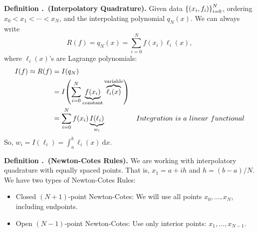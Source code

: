 \documentclass[12pt, a4paper]{article}
\newcounter{index}[subsection]
\newenvironment*{df}[1]{\par\noindent\textbf{Definition \thesubsection.\stepcounter{index}\theindex\ (#1).}}{\par}
\def\d{{\mathrm{d}}}
\def\dsst{\displaystyle}
\def\l{\ell}
\begin{document}
\begin{df}{Interpolatory Quadrature}
	Given data $\qty{(x_i,f_i)}_{i=0}^N$, ordering $x_0<x_1<\cdots<x_N$, and the interpolating polynomial $q_N(x)$. We can always write \[R(f)=q_N(x)=\sum_{i=0}^Nf(x_i)\l_i(x),\] where $\l_i(x)$'s are Lagrange polynomials: \begin{align*}I(f)\approx R(f)&=I(q_N)\\&=I\qty(\sum_{i=0}^N\underbrace{f(x_i)}_\text{constant}\overbrace{\l_i(x)}^\text{variable})\\&=\sum_{i=0}^Nf(x_i)\underbrace{I(\l_i)}_{w_i}&Integration\ is\ a\ linear\ functional\end{align*} So, $w_i=I(\l_i)=\dsst\int_a^b\l_i(x)\ \d{x}$.
\end{df}
\begin{df}{Newton-Cotes Rules}
	We are working with interpolatory quadrature with equally spaced points. That is, $x_1=a+ih$ and $h=(b-a)/N$. We have two types of Newton-Cotes Rules: 
	\begin{itemize}
		\item Closed $(N+1)$-point Newton-Cotes: We will use all points $x_0,\dots,x_N$, including endpoints.
		\item Open $(N-1)$-point Newton-Cotes: Use only interior points: $x_1,\dots,x_{N-1}$.
	\end{itemize}
\end{df}
\end{document}
